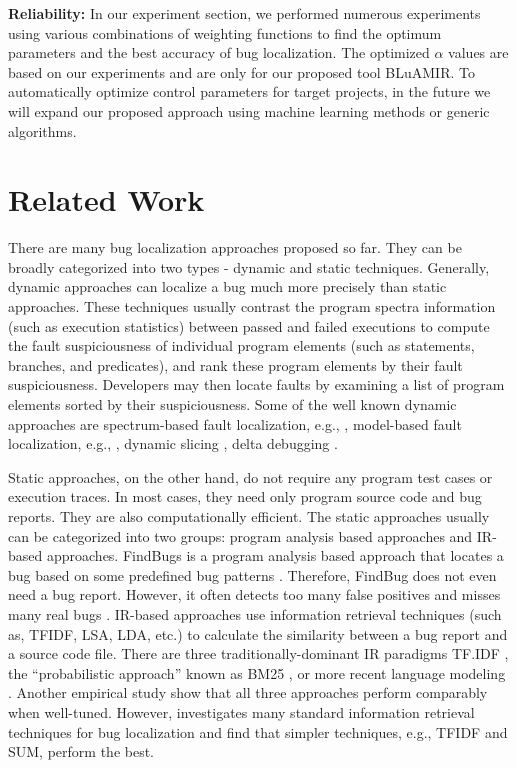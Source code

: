 \documentclass[conference]{IEEEtran}
\begin{document}
\textbf{Reliability:}
In our experiment section, we performed numerous experiments using various combinations of weighting functions to find the optimum parameters and the best accuracy of bug localization. The optimized $\alpha$ values are based on our experiments and are only for our proposed tool BLuAMIR. To automatically optimize control parameters for target projects, in the future we will expand our proposed approach using machine learning methods or generic algorithms.

\section{Related Work}\label{relatedwork}
There are many bug localization approaches proposed so far. They can be broadly categorized into two types - dynamic and static techniques. Generally, dynamic approaches can localize a bug much more precisely than static approaches. These techniques usually contrast the program spectra information (such as execution statistics) between passed and failed executions to compute the fault suspiciousness of individual program elements (such as statements, branches, and predicates), and rank these program elements by their fault suspiciousness. Developers may then locate faults by examining a list of program elements sorted by their suspiciousness. Some of the well known dynamic approaches are spectrum-based fault localization, e.g., \cite{Abreu,Jones,Lucia,SahaFault}, model-based fault localization, e.g., \cite{Feldman,Mayer}, dynamic slicing \cite{Zhang:2005}, delta debugging \cite{Zeller:2002}. 

Static approaches, on the other hand, do not require any program test cases or execution traces. In most cases, they need only program source code and bug reports. They are also computationally efficient. The static approaches usually can be categorized into two groups: program analysis based approaches and IR-based approaches. FindBugs is a program analysis based approach that locates a bug based on some predefined bug patterns \cite{FindBug}. Therefore, FindBug does not even need a bug report. However, it often detects too many false positives and misses many real bugs \cite{Tang}. IR-based approaches use information retrieval techniques (such as, TFIDF, LSA, LDA, etc.) to calculate the similarity between a bug report and a source code file. There are three traditionally-dominant IR paradigms TF.IDF \cite{Salton}, the “probabilistic approach” known as BM25 \cite{Robertson}, or more recent language modeling \cite{Ponte}. Another empirical study \cite{Fang} show that all three approaches perform comparably when well-tuned. However, \citet{Rao} investigates many standard information retrieval techniques for bug localization and find that simpler techniques, e.g., TFIDF and SUM, perform the best. 
\end{document}
